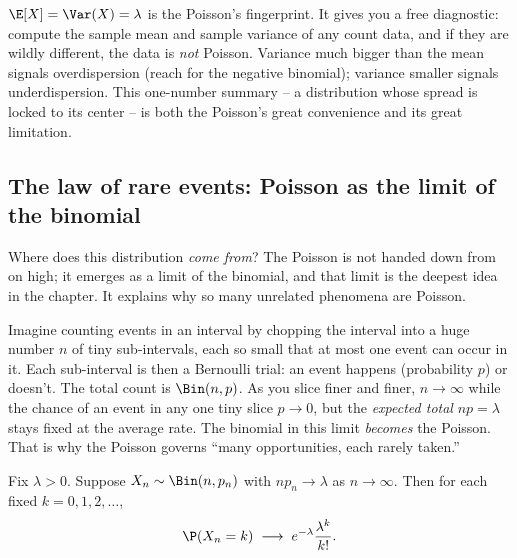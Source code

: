 \begin{aestheticbox}
$\E[X] = \Var(X) = \lambda$ is the Poisson's fingerprint. It gives you a free
diagnostic: compute the sample mean and sample variance of any count data, and if
they are wildly different, the data is \emph{not} Poisson. Variance much bigger
than the mean signals overdispersion (reach for the negative binomial); variance
smaller signals underdispersion. This one-number summary -- a distribution whose
spread is locked to its center -- is both the Poisson's great convenience and its
great limitation.
\end{aestheticbox}

\subsection{The law of rare events: Poisson as the limit of the binomial}
\label{ch07:poisson-limit}

Where does this distribution \emph{come from}? The Poisson is not handed down from
on high; it emerges as a limit of the binomial, and that limit is the deepest idea
in the chapter. It explains why so many unrelated phenomena are Poisson.

\begin{intuitionbox}
Imagine counting events in an interval by chopping the interval into a huge number
$n$ of tiny sub-intervals, each so small that at most one event can occur in it.
Each sub-interval is then a Bernoulli trial: an event happens (probability $p$) or
doesn't. The total count is $\Bin(n, p)$. As you slice finer and finer,
$n \to \infty$ while the chance of an event in any one tiny slice
$p \to 0$, but the \emph{expected total} $np = \lambda$ stays fixed at the average
rate. The binomial in this limit \emph{becomes} the Poisson. That is why the
Poisson governs ``many opportunities, each rarely taken.''
\end{intuitionbox}

\begin{theorem}
\label{ch07:poisson-limit-thm}
Fix $\lambda > 0$. Suppose $X_n \sim \Bin(n, p_n)$ with $n p_n \to \lambda$ as
$n \to \infty$. Then for each fixed $k = 0,1,2,\dots$,
\[
  \P(X_n = k) \;\longrightarrow\; e^{-\lambda}\frac{\lambda^k}{k!}.
\]
\end{theorem}

